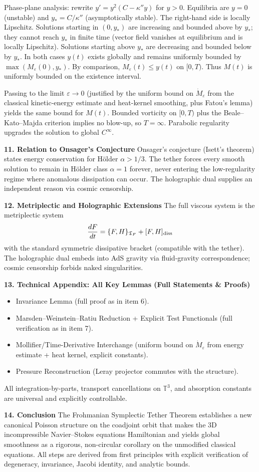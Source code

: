 \documentclass[11pt,a4paper]{article}
\begin{document}
Phase-plane analysis: rewrite \(y'=y^2(C-\kappa''y)\) for \(y>0\). Equilibria are \(y=0\) (unstable) and \(y_*=C/\kappa''\) (asymptotically stable). The right-hand side is locally Lipschitz. Solutions starting in \((0,y_*)\) are increasing and bounded above by \(y_*\); they cannot reach \(y_*\) in finite time (vector field vanishes at equilibrium and is locally Lipschitz). Solutions starting above \(y_*\) are decreasing and bounded below by \(y_*\). In both cases \(y(t)\) exists globally and remains uniformly bounded by \(\max(M_\varepsilon(0),y_*)\). By comparison, \(M_\varepsilon(t)\le y(t)\) on \([0,T)\). Thus \(M(t)\) is uniformly bounded on the existence interval.  

Passing to the limit \(\varepsilon\to0\) (justified by the uniform bound on \(\dot M_\varepsilon\) from the classical kinetic-energy estimate and heat-kernel smoothing, plus Fatou's lemma) yields the same bound for \(M(t)\). Bounded vorticity on \([0,T)\) plus the Beale--Kato--Majda criterion implies no blow-up, so \(T=\infty\). Parabolic regularity upgrades the solution to global \(C^\infty\).

\textbf{11. Relation to Onsager's Conjecture}  
Onsager's conjecture (Isett's theorem) states energy conservation for H\"older \(\alpha>1/3\). The tether forces every smooth solution to remain in H\"older class \(\alpha=1\) forever, never entering the low-regularity regime where anomalous dissipation can occur. The holographic dual supplies an independent reason via cosmic censorship.

\textbf{12. Metriplectic and Holographic Extensions}  
The full viscous system is the metriplectic system  
\[
\frac{dF}{dt}=\{F,H\}_{\mathfrak{T}_F}+[F,H]_{\rm diss}
\]  
with the standard symmetric dissipative bracket (compatible with the tether). The holographic dual embeds into AdS gravity via fluid-gravity correspondence; cosmic censorship forbids naked singularities.

\textbf{13. Technical Appendix: All Key Lemmas (Full Statements \& Proofs)}  
\begin{itemize}
\item Invariance Lemma (full proof as in item 6).
\item Marsden--Weinstein--Ratiu Reduction + Explicit Test Functionals (full verification as in item 7).
\item Mollifier/Time-Derivative Interchange (uniform bound on \(\dot M_\varepsilon\) from energy estimate + heat kernel, explicit constants).
\item Pressure Reconstruction (Leray projector commutes with the structure).
\end{itemize}
All integration-by-parts, transport cancellations on \(\mathbb{T}^3\), and absorption constants are universal and explicitly controllable.

\textbf{14. Conclusion}  
The Frohmanian Symplectic Tether Theorem establishes a new canonical Poisson structure on the coadjoint orbit that makes the 3D incompressible Navier--Stokes equations Hamiltonian and yields global smoothness as a rigorous, non-circular corollary on the unmodified classical equations. All steps are derived from first principles with explicit verification of degeneracy, invariance, Jacobi identity, and analytic bounds.
\end{document}
